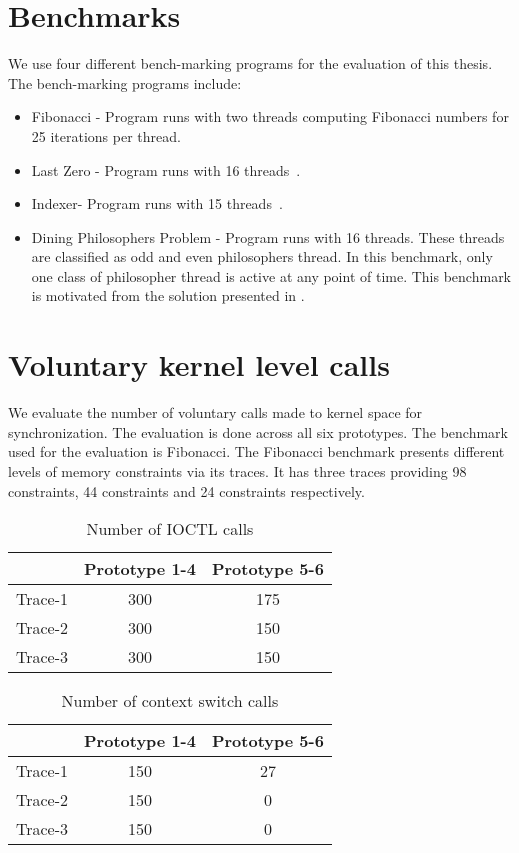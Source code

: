 \section{Benchmarks}

We use four different bench-marking programs for the evaluation of this thesis. 
The bench-marking programs include:
\begin{itemize}
\item{Fibonacci} - Program runs with two threads computing Fibonacci numbers for 25 iterations per thread.
\item{Last Zero} - Program runs with 16 threads~\citep{abdulla2014optimal}.
\item{Indexer}- Program runs with 15 threads~\citep{dynamic_por}.
\item{Dining Philosophers Problem} - Program runs with 16 threads. These threads are classified as odd and even philosophers thread. 
In this benchmark, only one class of philosopher thread is active at any point of time. 
This benchmark is motivated from the solution presented in \citet{silberschatz2014operating}.
\end{itemize}

\section{Voluntary kernel level calls}

We evaluate the number of voluntary calls made to kernel space for synchronization. 
The evaluation is done across all six prototypes. 
The benchmark used for the evaluation is Fibonacci. 
The Fibonacci benchmark presents different levels of memory constraints via its traces. 
It has three traces providing 98 constraints, 44 constraints and 24 constraints respectively.

\begin{table}
\begin{center}
 \begin{tabular}{|c c c|} 
 \hline
 & Prototype 1-4 & Prototype 5-6\\ %
 \hline
 Trace-1 & 300 & 175\\ 
 Trace-2 & 300 & 150\\
 Trace-3 & 300 & 150\\
 \hline
\end{tabular}
\end{center}
\caption{Number of IOCTL calls}
\label{num_ioctls}
\end{table}
\begin{table}
\begin{center}
 \begin{tabular}{|c c c|} 
 \hline
 & Prototype 1-4 & Prototype 5-6\\ %
 \hline
 Trace-1 & 150 & 27\\ 
 Trace-2 & 150 & 0\\
 Trace-3 & 150 & 0\\
 \hline
\end{tabular}
\end{center}
\caption{Number of context switch calls}
\label{num_ctxts}
\end{table}

